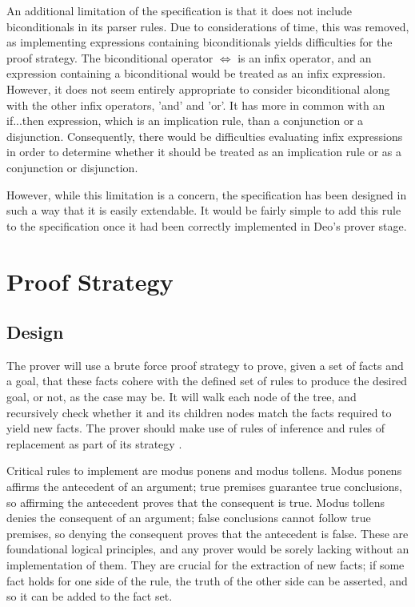 \documentclass{l4proj}
\begin{document}
An additional limitation of the specification is that it does not include biconditionals in its parser 
rules. Due to considerations of time, this was removed, as implementing expressions containing 
biconditionals yields difficulties for the proof strategy. The biconditional operator $\iff$ is an 
infix 
operator, and an expression containing a biconditional would be treated as an infix expression. However, it does not seem entirely appropriate to consider biconditional along with the other infix operators, 'and' and 'or'. It has more in common with an if...then expression, which is an implication rule, than a conjunction or a disjunction. Consequently, there would be difficulties evaluating infix expressions in order to determine whether it should be treated as an implication rule or as a conjunction or disjunction. 

However, while this limitation is a concern, the specification has been designed in such a way that it is easily extendable. It would be fairly simple to add this rule to the specification once it had been correctly implemented in Deo's prover stage. 

\section{Proof Strategy}

\subsection{Design}
The prover will use a brute force proof strategy to prove, given a set of facts and a goal, that these facts cohere with the defined set of rules to produce the desired goal, or not, as the case may be. It will walk each node of the tree, and recursively check whether it and its children nodes match the facts required to yield new facts. The prover should make use of rules of inference and rules of replacement as part of its strategy \cite{infrules}. 

Critical rules to implement are modus ponens and modus tollens. Modus ponens affirms the antecedent of an argument; true premises guarantee true conclusions, so affirming the antecedent proves that the consequent is true. Modus tollens denies the consequent of an argument; false conclusions cannot follow true premises, so denying the consequent proves that the antecedent is false. These are foundational logical principles, and any prover would be sorely lacking without an implementation of them. They are crucial for the extraction of new facts; if some fact holds for one side of the rule, the truth of the other side can be asserted, and so it can be added to the fact set. 
\end{document}
